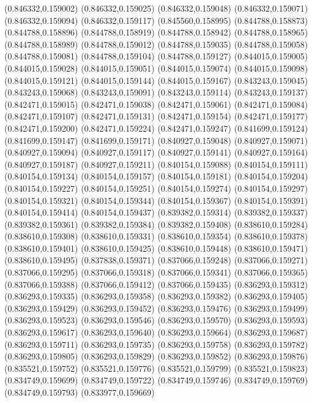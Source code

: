 (0.846332,0.159002)
(0.846332,0.159025)
(0.846332,0.159048)
(0.846332,0.159071)
(0.846332,0.159094)
(0.846332,0.159117)
(0.845560,0.158995)
(0.844788,0.158873)
(0.844788,0.158896)
(0.844788,0.158919)
(0.844788,0.158942)
(0.844788,0.158965)
(0.844788,0.158989)
(0.844788,0.159012)
(0.844788,0.159035)
(0.844788,0.159058)
(0.844788,0.159081)
(0.844788,0.159104)
(0.844788,0.159127)
(0.844015,0.159005)
(0.844015,0.159028)
(0.844015,0.159051)
(0.844015,0.159074)
(0.844015,0.159098)
(0.844015,0.159121)
(0.844015,0.159144)
(0.844015,0.159167)
(0.843243,0.159045)
(0.843243,0.159068)
(0.843243,0.159091)
(0.843243,0.159114)
(0.843243,0.159137)
(0.842471,0.159015)
(0.842471,0.159038)
(0.842471,0.159061)
(0.842471,0.159084)
(0.842471,0.159107)
(0.842471,0.159131)
(0.842471,0.159154)
(0.842471,0.159177)
(0.842471,0.159200)
(0.842471,0.159224)
(0.842471,0.159247)
(0.841699,0.159124)
(0.841699,0.159147)
(0.841699,0.159171)
(0.840927,0.159048)
(0.840927,0.159071)
(0.840927,0.159094)
(0.840927,0.159117)
(0.840927,0.159141)
(0.840927,0.159164)
(0.840927,0.159187)
(0.840927,0.159211)
(0.840154,0.159088)
(0.840154,0.159111)
(0.840154,0.159134)
(0.840154,0.159157)
(0.840154,0.159181)
(0.840154,0.159204)
(0.840154,0.159227)
(0.840154,0.159251)
(0.840154,0.159274)
(0.840154,0.159297)
(0.840154,0.159321)
(0.840154,0.159344)
(0.840154,0.159367)
(0.840154,0.159391)
(0.840154,0.159414)
(0.840154,0.159437)
(0.839382,0.159314)
(0.839382,0.159337)
(0.839382,0.159361)
(0.839382,0.159384)
(0.839382,0.159408)
(0.838610,0.159284)
(0.838610,0.159308)
(0.838610,0.159331)
(0.838610,0.159354)
(0.838610,0.159378)
(0.838610,0.159401)
(0.838610,0.159425)
(0.838610,0.159448)
(0.838610,0.159471)
(0.838610,0.159495)
(0.837838,0.159371)
(0.837066,0.159248)
(0.837066,0.159271)
(0.837066,0.159295)
(0.837066,0.159318)
(0.837066,0.159341)
(0.837066,0.159365)
(0.837066,0.159388)
(0.837066,0.159412)
(0.837066,0.159435)
(0.836293,0.159312)
(0.836293,0.159335)
(0.836293,0.159358)
(0.836293,0.159382)
(0.836293,0.159405)
(0.836293,0.159429)
(0.836293,0.159452)
(0.836293,0.159476)
(0.836293,0.159499)
(0.836293,0.159523)
(0.836293,0.159546)
(0.836293,0.159570)
(0.836293,0.159593)
(0.836293,0.159617)
(0.836293,0.159640)
(0.836293,0.159664)
(0.836293,0.159687)
(0.836293,0.159711)
(0.836293,0.159735)
(0.836293,0.159758)
(0.836293,0.159782)
(0.836293,0.159805)
(0.836293,0.159829)
(0.836293,0.159852)
(0.836293,0.159876)
(0.835521,0.159752)
(0.835521,0.159776)
(0.835521,0.159799)
(0.835521,0.159823)
(0.834749,0.159699)
(0.834749,0.159722)
(0.834749,0.159746)
(0.834749,0.159769)
(0.834749,0.159793)
(0.833977,0.159669)
